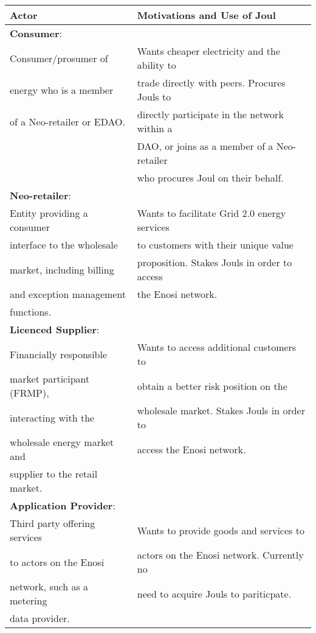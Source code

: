 \documentclass{article}
\newcommand{\head}[1]{\textnormal{\textbf{#1}}}
\theoremstyle{definition}
\theoremstyle{plain} %
\begin{document}
\begin{tabular}{|l|l|}
 \hline 	
 \head{Actor} & \head{Motivations and Use of Joul}\\
 \hline 
 \hline
 
 \textbf{Consumer}:				& \\
 \hline 
 Consumer/prosumer of 	 		& Wants cheaper electricity and the ability to	\\
 energy who is a member  		& trade directly with peers. Procures Jouls to	\\
 of a Neo-retailer or EDAO.		& directly participate in the network within a	\\
  								& DAO, or joins as a member of a Neo-retailer	\\
 								& who procures Joul on their behalf. 			\\
 \hline

 \textbf{Neo-retailer}:			& \\
 \hline
 Entity providing a consumer	& Wants to facilitate Grid 2.0 energy services	\\
 interface to the wholesale 	& to customers with their unique value 			\\
 market, including billing 		& proposition. Stakes Jouls in order to access 	\\
 and exception management 		& the Enosi network.							\\
 functions. 					& \\ 
 \hline 
 
 \textbf{Licenced Supplier}:	& \\ 
 \hline
 Financially responsible 		& Wants to access additional customers to 		\\
 market participant (FRMP), 	& obtain a better risk position on the			\\
 interacting with the 			& wholesale market. Stakes Jouls in order to 	\\
 wholesale energy market and 	& access the Enosi network.						\\
 supplier to the retail market.	& \\
 \hline 
 
 \textbf{Application Provider}:	& \\
 \hline 
 Third party offering services	& Wants to provide goods and services to 		\\
 to actors on the Enosi 		& actors on the Enosi network. Currently no 	\\
 network, such as a metering	& need to acquire Jouls to pariticpate.			\\
 data provider.					& \\
 \hline
 

\end{tabular}
\end{document}
